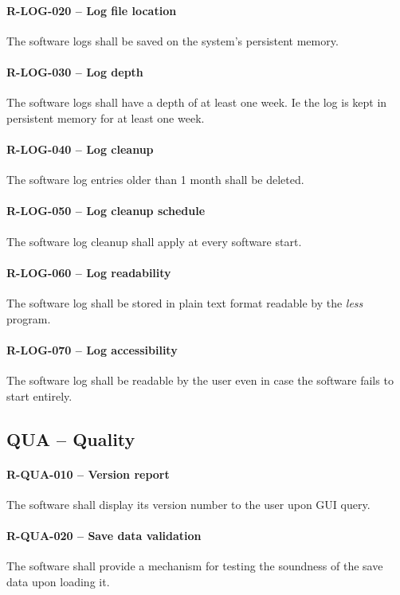 \paragraph{R-LOG-020 -- Log file location}
The software logs shall be saved on the system's persistent memory.

\paragraph{R-LOG-030 -- Log depth}
The software logs shall have a depth of at least one week. Ie the
log is kept in persistent memory for at least one week.

\paragraph{R-LOG-040 -- Log cleanup}
The software log entries older than 1 month shall be deleted.

\paragraph{R-LOG-050 -- Log cleanup schedule}
The software log cleanup shall apply at every software start.

\paragraph{R-LOG-060 -- Log readability}
The software log shall be stored in plain text format readable
by the \emph{less} program.

\paragraph{R-LOG-070 -- Log accessibility}
The software log shall be readable by the user even in case the software
fails to start entirely.

\subsection{QUA -- Quality}
\paragraph{R-QUA-010 -- Version report}
The software shall display its version number to the user upon \gls{GUI} query.

\paragraph{R-QUA-020 -- Save data validation}
The software shall provide a mechanism for testing the soundness of the
save data upon loading it.

